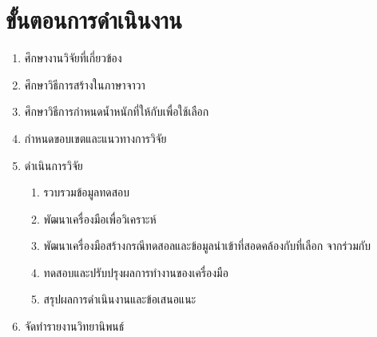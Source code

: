 \section{ขั้นตอนการดำเนินงาน}

\begin{enumerate}
    \item ศึกษางานวิจัยที่เกี่ยวข้อง
    \item ศึกษาวิธีการสร้าง{\scg}ในภาษาจาวา
    \item ศึกษาวิธีการกำหนดน้ำหนักที่ให้กับ{\scg}เพื่อใช้เลือก{\TestPath}
    \item กำหนดขอบเขตและแนวทางการวิจัย
    \item ดำเนินการวิจัย
    \begin{enumerate}
        \item รวบรวมข้อมูลทดสอบ
        \item พัฒนาเครื่องมือเพื่อวิเคราะห์{\scg}
        \item พัฒนาเครื่องมือสร้างกรณีทดสอลและข้อมูลนำเข้าที่สอดคล้องกับ{\TestPath}ที่เลือก จาก{\scg}ร่วมกับ{\cfg}
        \item ทดสอบและปรับปรุงผลการทำงานของเครื่องมือ
        \item สรุปผลการดำเนินงานและข้อเสนอแนะ
    \end{enumerate}
    \item จัดทำรายงานวิทยานิพนธ์
\end{enumerate}
